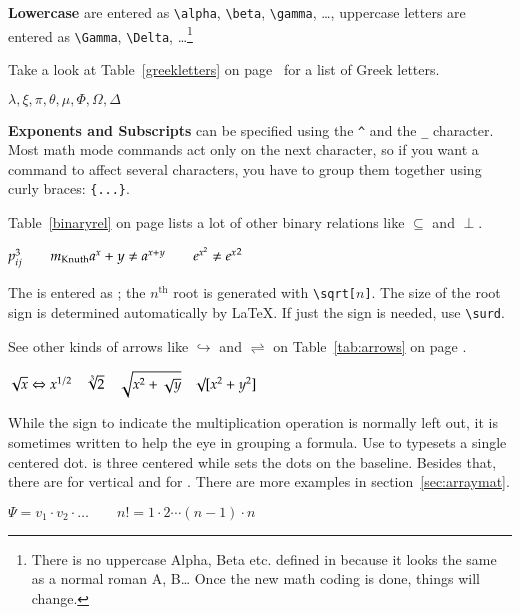\textbf{Lowercase } are entered as \verb|\alpha|,
 \verb|\beta|, \verb|\gamma|, \ldots, uppercase letters
are entered as \verb|\Gamma|, \verb|\Delta|, \ldots\footnote{There is no
  uppercase Alpha, Beta etc. defined in \LaTeXe{} because it looks the same as a 
  normal roman A, B\ldots{} Once the new math coding is done, things will
  change.} 

Take a look at Table~\ref{greekletters} on page~\pageref{greekletters} for a
list of Greek letters.
\begin{example}
$\lambda,\xi,\pi,\theta,
 \mu,\Phi,\Omega,\Delta$
\end{example}


\textbf{Exponents and Subscripts} can be specified using
the \verb|^| and the \verb|_| character.
Most math mode commands act only on the next character, so if you
want a command to affect several characters, you have to group them
together using curly braces: \verb|{...}|.

Table~\ref{binaryrel} on page \pageref{binaryrel} lists a lot of other binary
relations like $\subseteq$ and $\perp$.

\begin{example}
$p^3_{ij} \qquad
 m_\text{Knuth} \\[5pt]
 a^x+y \neq a^{x+y}\qquad 
 e^{x^2} \neq {e^x}^2$
\end{example}


The \textbf{} is entered as ; the
$n^\text{th}$ root is generated with \verb|\sqrt[|$n$\verb|]|. The size of
the root sign is determined automatically by \LaTeX. If just the sign
is needed, use \verb|\surd|.

See other kinds of arrows like $\hookrightarrow$ and $\rightleftharpoons$ on
Table~\ref{tab:arrows} on page \pageref{tab:arrows}. 
\begin{example}
$\sqrt{x} \Leftrightarrow x^{1/2}
 \quad \sqrt[3]{2}
 \quad \sqrt{x^{2} + \sqrt{y}}
 \quad \surd[x^2 + y^2]$
\end{example}


While the \textbf{} sign to indicate
the multiplication operation is normally left out, it is sometimes written
to help the eye in grouping a formula.
Use  to typesets a single centered dot.  is
three centered \textbf{} while  sets the dots on the
baseline. Besides that, there are  for 
vertical and  for . There are more examples in 
section~\ref{sec:arraymat}.
\begin{example}
$\Psi = v_1 \cdot v_2
 \cdot \ldots \qquad 
 n! = 1 \cdot 2 
 \cdots (n-1) \cdot n$
\end{example}

